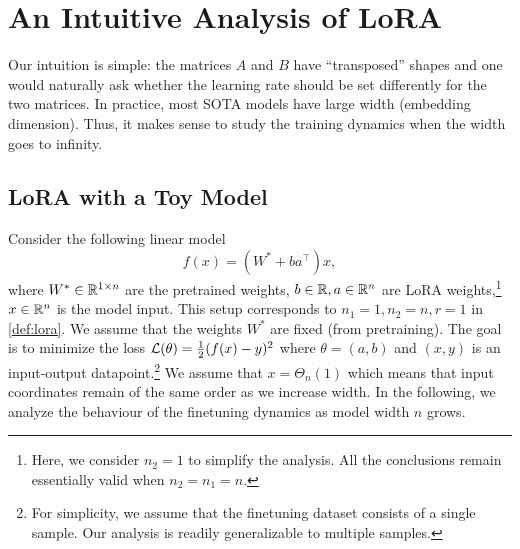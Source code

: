 \section{An Intuitive Analysis of LoRA}\label{sec:toy}
Our intuition is simple: the matrices $A$ and $B$ have ``transposed'' shapes and one would naturally ask whether the learning rate should be set differently for the two matrices. In practice, most SOTA models have large width (embedding dimension). Thus, it makes sense to study the training dynamics when the width goes to infinity. 
\subsection{LoRA with a Toy Model}
Consider the following linear model 
\begin{equation}\label{eq:toy_model}
f(x)=(W^*+b a^\top)x,
\end{equation}
where $W^* \in \mathbb{R}^{1\times n}$ are the pretrained weights, $b\in\mathbb{R},a\in\mathbb{R}^{n}$ are LoRA weights,\footnote{Here, we consider $n_2 = 1$ to simplify the analysis. All the conclusions remain essentially valid when $n_2 = n_1 = n$.} $x\in\mathbb{R}^{n}$ is the model input. This setup corresponds to $n_1=1, n_2=n, r=1$ in \cref{def:lora}. We assume that the weights $W^*$ are fixed (from pretraining). The goal is to minimize the loss $\mathcal{L}(\theta)=\frac{1}{2}(f(x)-y)^{2}$ where $\theta=(a,b)$ and $(x,y)$ is an input-output datapoint.\footnote{For simplicity, we assume that the finetuning dataset consists of a single sample. Our analysis is readily generalizable to multiple samples.} We assume that $x = \Theta_n(1)$ which means that input coordinates remain of the same order as we increase width. In the following, we analyze the behaviour of the finetuning dynamics as model width $n$ grows. 

